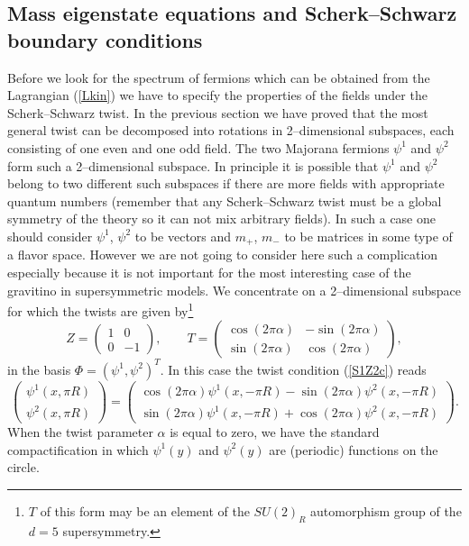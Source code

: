 \documentclass[a4paper,12pt]{article}
\def\al{\alpha}
\begin{document}
\subsection{Mass eigenstate equations and Scherk--Schwarz boundary
conditions} 


Before we look for the spectrum of fermions which can be obtained from
the Lagrangian (\ref{Lkin}) we have to specify the properties of the
fields under the Scherk--Schwarz twist. In the previous section we
have proved that the most general twist can be decomposed into
rotations in 2--dimensional subspaces, each consisting of one even and
one odd field. The two Majorana fermions $\psi^1$ and $\psi^2$ form
such a 2--dimensional subspace. In principle it is possible that
$\psi^1$ and $\psi^2$ belong to two different such subspaces if there
are more fields with appropriate quantum numbers (remember that any
Scherk--Schwarz twist must be a global symmetry of the theory so it
can not mix arbitrary fields). In such a case one should consider
$\psi^1$, $\psi^2$ to be vectors and $m_+$, $m_-$ to be matrices in
some type of a flavor space. However we are not going to consider here
such a complication especially because it is not important for the
most interesting case of the gravitino in supersymmetric models. We
concentrate on a 2--dimensional subspace for which the twists are
given by\footnote{
$T$ of this form may be an element of the $SU(2)_R$
automorphism group of the $d=5$ supersymmetry.
}
\begin{equation}
Z=
\left(
\begin{array}{cr}
1&0
\\[6pt]
0&-1
\end{array}
\right)
,\qquad
T=
\left(
\begin{array}{cr}
\cos(2\pi\al)&-\sin(2\pi\al)
\\[6pt]
\sin(2\pi\al)&\cos(2\pi\al)
\end{array}
\right)
,
\end{equation}
in the basis $\Phi=(\psi^1,\psi^2)^T$. 
In this case the twist condition (\ref{S1Z2c}) reads
\begin{equation}
\left(
\begin{array}{c}
\psi^1(x,\pi R)
\\[6pt]
\psi^2(x,\pi R)
\end{array}
\right)
=
\left(
\begin{array}{c}
\cos(2\pi\al)\psi^1(x,-\pi R)-\sin(2\pi\al)\psi^2(x,-\pi R)
\\[6pt]
\sin(2\pi\al)\psi^1(x,-\pi R)+\cos(2\pi\al)\psi^2(x,-\pi R)
\end{array}
\right)
.
\label{psitwist}
\end{equation}
When the twist parameter $\al$ is equal to zero, we have the standard 
compactification in which $\psi^1(y)$ and $\psi^2(y)$ are
(periodic) functions on the circle.
\end{document}
